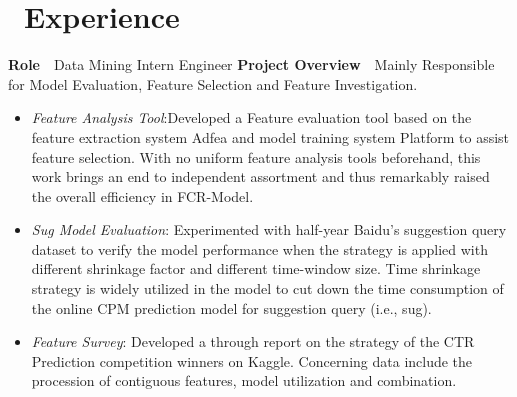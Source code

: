 \documentclass[13pt,a4paper]{resume}
\begin{document}
\section{\faUsers\ Experience}
\textbf{Role}\ \ Data Mining Intern Engineer
\newline
\textbf{Project Overview}\ \ Mainly Responsible for Model Evaluation, Feature Selection and Feature Investigation.
\begin{itemize}

\item {\emph{Feature Analysis Tool}}:Developed a Feature evaluation tool based on the feature extraction system Adfea and model training system Platform to assist feature selection. With no uniform feature analysis tools beforehand, this work brings an end to independent assortment and thus remarkably raised the overall efficiency in FCR-Model.
\item {\emph{Sug Model Evaluation}}: Experimented with half-year Baidu’s suggestion query dataset to verify the model performance when the strategy is applied with different shrinkage factor and different time-window size. Time shrinkage strategy is widely utilized in the model to cut down the time consumption of the online CPM prediction model for suggestion query (i.e., sug). 
\item {\emph{Feature Survey}}: Developed a through report on the strategy of the CTR Prediction competition winners on Kaggle. Concerning data include the procession of contiguous features, model utilization and combination.
\end{itemize}
\end{document}
